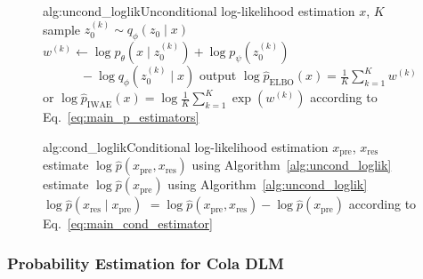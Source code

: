 \begin{figure}[t]
\centering

\begin{minipage}[t][0.185\textheight][t]{0.485\linewidth}
\vspace{0pt}
\footnotesize
\begin{sidealgorithm}{alg:uncond_loglik}{Unconditional log-likelihood estimation}
\Require $x$, $K$
    \State sample $z_0^{(k)} \sim q_\phi(z_0 \mid x)$
    \State $w^{(k)} \gets \log p_\theta(x \mid z_0^{(k)}) + \log p_\psi(z_0^{(k)})$
    \Statex \hspace{\algorithmicindent}$\qquad\quad - \log q_\phi(z_0^{(k)} \mid x)$
\EndFor
\State output $\log \widehat p_{\mathrm{ELBO}}(x)=\frac{1}{K}\sum_{k=1}^K w^{(k)}$
\Statex \hspace{\algorithmicindent}or $\log \widehat p_{\mathrm{IWAE}}(x)=\log \frac{1}{K}\sum_{k=1}^K \exp(w^{(k)})$
\Statex \hspace{\algorithmicindent}according to Eq.~\eqref{eq:main_p_estimators}
\end{sidealgorithm}
\end{minipage}
\hfill
\begin{minipage}[t][0.185\textheight][t]{0.485\linewidth}
\vspace{0pt}
\footnotesize
\begin{sidealgorithm}{alg:cond_loglik}{Conditional log-likelihood estimation}
\Require $x_{\mathrm{pre}}$, $x_{\mathrm{res}}$
\State estimate $\log \widehat p(x_{\mathrm{pre}},x_{\mathrm{res}})$
\Statex \hspace{\algorithmicindent}using Algorithm~\ref{alg:uncond_loglik}
\State estimate $\log \widehat p(x_{\mathrm{pre}})$
\Statex \hspace{\algorithmicindent}using Algorithm~\ref{alg:uncond_loglik}
\State \Return $\log \widehat p(x_{\mathrm{res}} \mid x_{\mathrm{pre}})$
\Statex \hspace{\algorithmicindent}$= \log \widehat p(x_{\mathrm{pre}},x_{\mathrm{res}}) - \log \widehat p(x_{\mathrm{pre}})$
\Statex \hspace{\algorithmicindent}according to Eq.~\eqref{eq:main_cond_estimator}
\end{sidealgorithm}
\end{minipage}

\end{figure}
\subsubsection{Probability Estimation for Cola DLM}

